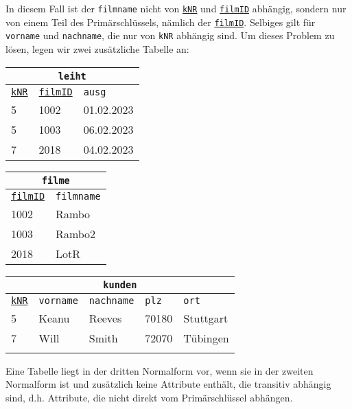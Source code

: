 In diesem Fall ist der \lstinline!filmname! nicht von \underline{\lstinline!kNR!} und \underline{\lstinline!filmID!} abhängig, sondern nur von einem Teil des Primärschlüssels, nämlich der \underline{\lstinline!filmID!}. Selbiges gilt für \lstinline!vorname! und \lstinline!nachname!, die nur von \lstinline!kNR! abhängig sind. Um dieses Problem zu lösen, legen wir zwei zusätzliche Tabelle an:\\
\begin{minipage}{\textwidth}
	\begin{minipage}{0.3\textwidth}
		\begin{tabular}{lll}
			\multicolumn{3}{c}{\lstinline!leiht!}\\
			\hline
			\underline{\lstinline!kNR!}&\underline{\lstinline!filmID!}&\lstinline!ausg!\\
			\hline
			5&1002&01.02.2023\\
			5&1003&06.02.2023\\
			7&2018&04.02.2023\\
		\end{tabular}
	\end{minipage}
	\begin{minipage}{0.228\textwidth}
		\begin{tabular}{ll}
			\multicolumn{2}{c}{\lstinline!filme!}\\
			\hline
			\underline{\lstinline!filmID!}&\lstinline!filmname!\\
			\hline
			1002&Rambo\\
			1003&Rambo2\\
			2018&LotR\\
		\end{tabular}
	\end{minipage}
	\begin{minipage}{0.472\textwidth}
		\begin{tabular}{lllll}
			\multicolumn{5}{c}{\lstinline!kunden!}\\
			\hline
			\underline{\lstinline!kNR!}&\lstinline!vorname!&\lstinline!nachname!&\lstinline!plz!&\lstinline!ort!\\
			\hline
			5&Keanu&Reeves&70180&Stuttgart\\
			7&Will&Smith&72070&Tübingen\\
			\phantom{0}&&&&\\
		\end{tabular}
	\end{minipage}
\end{minipage}
\begin{tcolorbox}[title=Dritte Normalform]
	Eine Tabelle liegt in der dritten Normalform vor, wenn sie in der zweiten Normalform ist und zusätzlich keine Attribute enthält, die transitiv abhängig sind, d.h. Attribute, die nicht direkt vom Primärschlüssel abhängen.
\end{tcolorbox}
